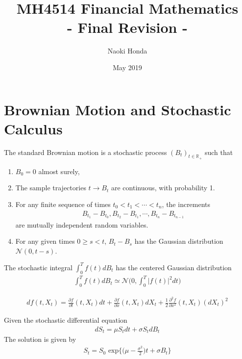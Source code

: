 \documentclass[12pt]{extarticle}
\title{\textbf{MH4514 Financial Mathematics}\\
\Large - Final Revision -}
\author{Naoki Honda}
\date{May 2019}
\newcommand{\<}{\langle}
\renewcommand{\>}{\rangle}
\theoremstyle{definition}
\begin{document}
\maketitle
\section{Brownian Motion and Stochastic Calculus}
\begin{tcolorbox}[enhanced, drop fuzzy shadow, title=Definition 5.1]
The standard Brownian motion is a stochastic process $(B_t)_{t \in \mathbb{R}_+}$ such that
\begin{enumerate}
    \item $B_0 = 0$ almost surely,
    \item The sample trajectories $t \longrightarrow B_t$ are continuous, with probability 1.
    \item For any finite sequence of times $t_0 < t_1 < \cdots < t_n$, the increments
    \begin{align*}
        B_{t_1} - B_{t_0}, B_{t_2} - B_{t_1}, \cdots, B_{t_n} - B_{t_{n-1}}
    \end{align*}
    are mutually independent random variables.
    \item For any given times $0 \geq s < t$, $B_t -B_s$ has the Gaussian distribution $\mathcal{N}(0,t-s)$.
\end{enumerate}
\end{tcolorbox}

\newpage
\begin{tcolorbox}[enhanced, drop fuzzy shadow, title=Lemma 5.3]
The stochastic integral $\int^T_0 f(t)dB_t$ has the centered Gaussian distribution
\begin{align*}
    \int^T_0 f(t)dB_t \simeq \mathcal{N}\bigg( 0, \int^T_0 |f(t)|^2 dt \bigg)
\end{align*}
\end{tcolorbox}

\begin{tcolorbox}[enhanced, drop fuzzy shadow, title=Stochastic Calculus]
\begin{align*}
    df(t,X_t) = \frac{\partial f}{\partial t}(t,X_t)dt + \frac{\partial f}{\partial x}(t,X_t)dX_t + \frac{1}{2}\frac{\partial^2 f}{\partial x^2}(t,X_t)(dX_t)^2
\end{align*}
\end{tcolorbox}

\begin{tcolorbox}[enhanced, drop fuzzy shadow, title=Proposition 5.12]
Given the stochastic differential equation
\begin{align*}
    dS_t = \mu S_t dt +\sigma S_t dB_t
\end{align*}
The solution is given by
\begin{align*}
    S_t = S_0 \text{ exp}\bigg\{\bigg(\mu - \frac{\sigma^2}{2} \bigg) t + \sigma B_t \bigg\}
\end{align*}
\end{tcolorbox}
\end{document}
